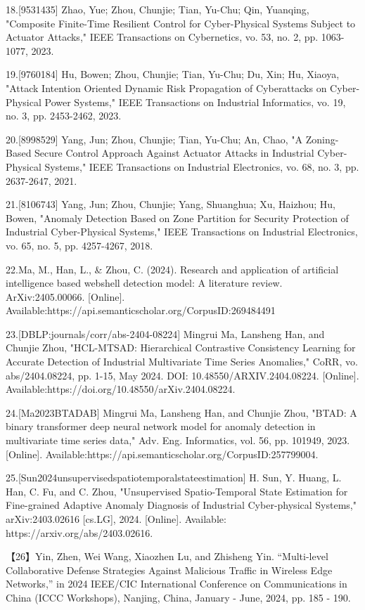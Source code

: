 18.[9531435] Zhao, Yue; Zhou, Chunjie; Tian, Yu-Chu; Qin, Yuanqing, "Composite Finite-Time Resilient Control for Cyber-Physical Systems Subject to Actuator Attacks," IEEE Transactions on Cybernetics, vo. 53, no. 2, pp. 1063-1077, 2023.

19.[9760184] Hu, Bowen; Zhou, Chunjie; Tian, Yu-Chu; Du, Xin; Hu, Xiaoya, "Attack Intention Oriented Dynamic Risk Propagation of Cyberattacks on Cyber-Physical Power Systems," IEEE Transactions on Industrial Informatics, vo. 19, no. 3, pp. 2453-2462, 2023.

20.[8998529] Yang, Jun; Zhou, Chunjie; Tian, Yu-Chu; An, Chao, "A Zoning-Based Secure Control Approach Against Actuator Attacks in Industrial Cyber-Physical Systems," IEEE Transactions on Industrial Electronics, vo. 68, no. 3, pp. 2637-2647, 2021.

21.[8106743] Yang, Jun; Zhou, Chunjie; Yang, Shuanghua; Xu, Haizhou; Hu, Bowen, "Anomaly Detection Based on Zone Partition for Security Protection of Industrial Cyber-Physical Systems," IEEE Transactions on Industrial Electronics, vo. 65, no. 5, pp. 4257-4267, 2018.

22.Ma, M., Han, L., \& Zhou, C. (2024). Research and application of artificial intelligence based webshell detection model: A literature review. ArXiv:2405.00066. [Online]. Available:https://api.semanticscholar.org/CorpusID:269484491

23.[DBLP:journals/corr/abs-2404-08224] Mingrui Ma, Lansheng Han, and Chunjie Zhou, "HCL-MTSAD: Hierarchical Contrastive Consistency Learning for Accurate Detection of Industrial Multivariate Time Series Anomalies," CoRR, vo. abs/2404.08224, pp. 1-15, May 2024. DOI: 10.48550/ARXIV.2404.08224. [Online]. Available:https://doi.org/10.48550/arXiv.2404.08224.

24.[Ma2023BTADAB] Mingrui Ma, Lansheng Han, and Chunjie Zhou, "BTAD: A binary transformer deep neural network model for anomaly detection in multivariate time series data," Adv. Eng. Informatics, vol. 56, pp. 101949, 2023. [Online]. Available:https://api.semanticscholar.org/CorpusID:257799004.

25.[Sun2024unsupervisedspatiotemporalstateestimation] H. Sun, Y. Huang, L. Han, C. Fu, and C. Zhou, "Unsupervised Spatio-Temporal State Estimation for Fine-grained Adaptive Anomaly Diagnosis of Industrial Cyber-physical Systems," arXiv:2403.02616 [cs.LG], 2024. [Online]. Available: https://arxiv.org/abs/2403.02616.

【26】Yin, Zhen, Wei Wang, Xiaozhen Lu, and Zhisheng Yin. “Multi-level Collaborative Defense Strategies Against Malicious Traffic in Wireless Edge Networks,” in 2024 IEEE/CIC International Conference on Communications in China (ICCC Workshops), Nanjing, China, January - June, 2024, pp. 185 - 190.

